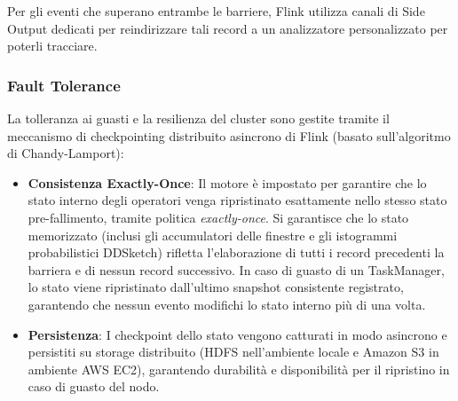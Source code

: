 \documentclass[conference]{IEEEtran}
\begin{document}
Per gli eventi che superano entrambe le barriere, Flink utilizza canali di Side Output dedicati per reindirizzare tali record a un analizzatore personalizzato per poterli tracciare.

\subsubsection{Fault Tolerance}\label{subsubsec:flink_checkpointing}
La tolleranza ai guasti e la resilienza del cluster sono gestite tramite il meccanismo di checkpointing distribuito asincrono di Flink (basato sull'algoritmo di Chandy-Lamport):
\begin{itemize}
    \item \textbf{Consistenza Exactly-Once}: Il motore è impostato per garantire che lo stato interno degli operatori venga ripristinato esattamente nello stesso stato pre-fallimento, tramite politica \emph{exactly-once}. Si garantisce che lo stato memorizzato (inclusi gli accumulatori delle finestre e gli istogrammi probabilistici DDSketch) rifletta l'elaborazione di tutti i record precedenti la barriera e di nessun record successivo. In caso di guasto di un TaskManager, lo stato viene ripristinato dall'ultimo snapshot consistente registrato, garantendo che nessun evento modifichi lo stato interno più di una volta.
    \item \textbf{Persistenza}: I checkpoint dello stato vengono catturati in modo asincrono e persistiti su storage distribuito (HDFS nell'ambiente locale e Amazon S3 in ambiente AWS EC2), garantendo durabilità e disponibilità per il ripristino in caso di guasto del nodo.
\end{itemize}
\end{document}
